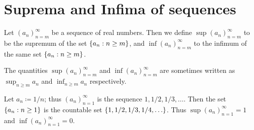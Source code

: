 \section{Suprema and Infima of sequences}\label{i:sec:6.3}

\begin{defn}\label{i:6.3.1}
  Let \((a_n)_{n = m}^\infty\) be a sequence of real numbers.
  Then we define \(\sup(a_n)_{n = m}^\infty\) to be the supremum of the set \(\left\lbrace a_n : n \geq m\right\rbrace\), and \(\inf(a_n)_{n = m}^\infty\) to the infimum of the same set \(\left\lbrace a_n : n \geq m\right\rbrace\).
\end{defn}

\begin{rmk}\label{i:6.3.2}
  The quantities \(\sup(a_n)_{n = m}^\infty\) and \(\inf(a_n)_{n = m}^\infty\) are sometimes written as \(\sup_{n \geq m} a_n\) and \(\inf_{n \geq m} a_n\) respectively.
\end{rmk}

\setcounter{thm}{3}
\begin{eg}\label{i:6.3.4}
  Let \(a_n \coloneqq 1 / n\);
  thus \((a_n)_{n = 1}^\infty\) is the sequence \(1, 1 / 2, 1 / 3, \dots\).
  Then the set \(\left\lbrace a_n : n \geq 1\right\rbrace\) is the countable set \(\set{1, 1 / 2, 1 / 3, 1 / 4, \dots}\).
  Thus \(\sup(a_n)_{n = 1}^\infty = 1\) and \(\inf(a_n)_{n = 1}^\infty = 0\).
\end{eg}

